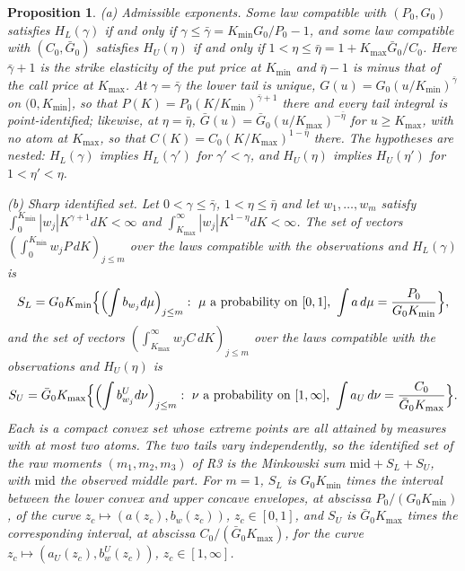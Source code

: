 \documentclass[11pt]{article}
\newtheorem{proposition}{Proposition}
\theoremstyle{remark}
\begin{document}
\begin{proposition}
(a) \emph{Admissible exponents.} Some law compatible with $(P_0,G_0)$ satisfies $H_L(\gamma)$ if and only if $\gamma\le\bar\gamma=K_{\min}G_0/P_0-1$, and some law compatible with $(C_0,\bar G_0)$ satisfies $H_U(\eta)$ if and only if $1<\eta\le\bar\eta=1+K_{\max}\bar G_0/C_0$. Here $\bar\gamma+1$ is the strike elasticity of the put price at $K_{\min}$ and $\bar\eta-1$ is minus that of the call price at $K_{\max}$. At $\gamma=\bar\gamma$ the lower tail is unique, $G(u)=G_0(u/K_{\min})^{\bar\gamma}$ on $(0,K_{\min}]$, so that $P(K)=P_0(K/K_{\min})^{\bar\gamma+1}$ there and every tail integral is point-identified; likewise, at $\eta=\bar\eta$, $\bar G(u)=\bar G_0(u/K_{\max})^{-\bar\eta}$ for $u\ge K_{\max}$, with no atom at $K_{\max}$, so that $C(K)=C_0(K/K_{\max})^{1-\bar\eta}$ there. The hypotheses are nested: $H_L(\gamma)$ implies $H_L(\gamma')$ for $\gamma'<\gamma$, and $H_U(\eta)$ implies $H_U(\eta')$ for $1<\eta'<\eta$.

(b) \emph{Sharp identified set.} Let $0<\gamma\le\bar\gamma$, $1<\eta\le\bar\eta$ and let $w_1,\dots,w_m$ satisfy $\int_0^{K_{\min}}|w_j|K^{\gamma+1}dK<\infty$ and $\int_{K_{\max}}^\infty|w_j|K^{1-\eta}dK<\infty$. The set of vectors $(\int_0^{K_{\min}}w_jP\,dK)_{j\le m}$ over the laws compatible with the observations and $H_L(\gamma)$ is
\[
S_L=G_0K_{\min}\Bigl\{\Bigl(\int b_{w_j}d\mu\Bigr)_{j\le m}:\ \mu\text{ a probability on }[0,1],\ \int a\,d\mu=\frac{P_0}{G_0K_{\min}}\Bigr\},
\]
and the set of vectors $(\int_{K_{\max}}^\infty w_jC\,dK)_{j\le m}$ over the laws compatible with the observations and $H_U(\eta)$ is
\[
S_U=\bar G_0K_{\max}\Bigl\{\Bigl(\int b^U_{w_j}d\nu\Bigr)_{j\le m}:\ \nu\text{ a probability on }[1,\infty],\ \int a_U\,d\nu=\frac{C_0}{\bar G_0K_{\max}}\Bigr\}.
\]
Each is a compact convex set whose extreme points are all attained by measures with at most two atoms. The two tails vary independently, so the identified set of the raw moments $(m_1,m_2,m_3)$ of R3 is the Minkowski sum $\mathrm{mid}+S_L+S_U$, with $\mathrm{mid}$ the observed middle part. For $m=1$, $S_L$ is $G_0K_{\min}$ times the interval between the lower convex and upper concave envelopes, at abscissa $P_0/(G_0K_{\min})$, of the curve $z_c\mapsto(a(z_c),b_w(z_c))$, $z_c\in[0,1]$, and $S_U$ is $\bar G_0K_{\max}$ times the corresponding interval, at abscissa $C_0/(\bar G_0K_{\max})$, for the curve $z_c\mapsto(a_U(z_c),b^U_w(z_c))$, $z_c\in[1,\infty]$.


\end{proposition}
\end{document}
